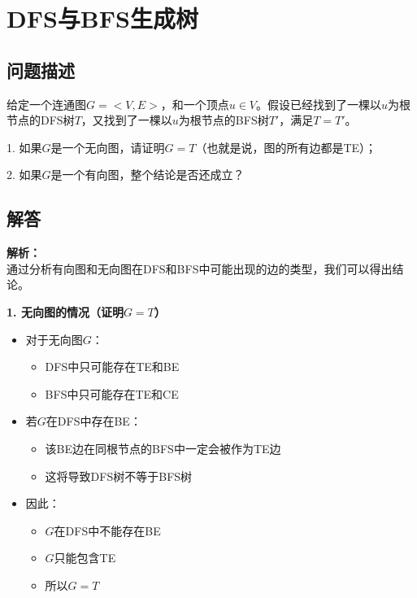 \documentclass{article}
\begin{document}
\section{DFS与BFS生成树}
\subsection{问题描述}

给定一个连通图$G=<V,E>$，和一个顶点$u\in V$。假设已经找到了一棵以$u$为根节点的DFS树$T$，又找到了一棵以$u$为根节点的BFS树$T'$，满足$T=T'$。

1. 如果$G$是一个无向图，请证明$G=T$（也就是说，图的所有边都是TE）；

2. 如果$G$是一个有向图，整个结论是否还成立？

\subsection{解答}

\noindent\textbf{解析：}\\
通过分析有向图和无向图在DFS和BFS中可能出现的边的类型，我们可以得出结论。

\noindent\textbf{1. 无向图的情况（证明$G=T$）}
\begin{itemize}
    \item 对于无向图$G$：
    \begin{itemize}
        \item DFS中只可能存在TE和BE
        \item BFS中只可能存在TE和CE
    \end{itemize}
    
    \item 若$G$在DFS中存在BE：
    \begin{itemize}
        \item 该BE边在同根节点的BFS中一定会被作为TE边
        \item 这将导致DFS树不等于BFS树
    \end{itemize}
    
    \item 因此：
    \begin{itemize}
        \item $G$在DFS中不能存在BE
        \item $G$只能包含TE
        \item 所以$G = T$
    \end{itemize}
\end{itemize}
\end{document}
